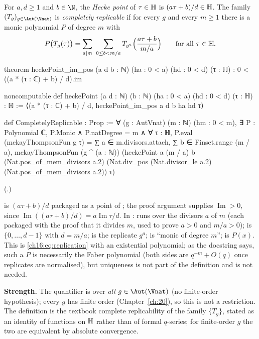 \begin{definition}\label{ch16:def:replicable}
For $a,d\ge1$ and $b\in\N$, the \emph{Hecke point} of $\tau\in\mathbb{H}$ is $(a\tau+b)/d\in\mathbb{H}$.  The family
$(T_g)_{g\in\Aut(\Vnat)}$ is \emph{completely replicable} if for every $g$ and every $m\ge1$ there is a monic
polynomial $P$ of degree $m$ with
\begin{equation*}
  P\bigl(T_g(\tau)\bigr)=\sum_{a\mid m}\ \sum_{0\le b<m/a}T_{g^a}\Bigl(\frac{a\tau+b}{m/a}\Bigr)
  \qquad\text{for all }\tau\in\chsixteenH .
\end{equation*}
\end{definition}
\begin{leancode}
theorem heckePoint_im_pos (a d b : ℕ) (ha : 0 < a) (hd : 0 < d) (τ : ℍ) :
    0 < ((a * (τ : ℂ) + b) / d).im

noncomputable def heckePoint (a d : ℕ) (b : ℕ) (ha : 0 < a) (hd : 0 < d) (τ : ℍ) : ℍ :=
  ⟨(a * (τ : ℂ) + b) / d, heckePoint_im_pos a d b ha hd τ⟩

def CompletelyReplicable : Prop :=
  ∀ (g : AutVnat) (m : ℕ) (hm : 0 < m), ∃ P : Polynomial ℂ, P.Monic ∧ P.natDegree = m ∧
    ∀ τ : ℍ, P.eval (mckayThompsonFun g τ) =
      ∑ a ∈ m.divisors.attach, ∑ b ∈ Finset.range (m / a),
        mckayThompsonFun (g ^ (a : ℕ)) (heckePoint a (m / a) b (Nat.pos_of_mem_divisors a.2)
          (Nat.div_pos (Nat.divisor_le a.2) (Nat.pos_of_mem_divisors a.2)) τ)
\end{leancode}
(.)
\begin{dictionary}
 is $(a\tau+b)/d$ packaged as a point of ; the proof argument
 supplies $\operatorname{Im}>0$, since $\operatorname{Im}((a\tau+b)/d)=a\operatorname{Im}\tau/d$.
In :  runs over the divisors $a$ of $m$ (each packaged with the proof
that it divides $m$, used to prove $a>0$ and $m/a>0$);  is $\{0,\dots,d-1\}$ with
$d=m/a$;  is the replicate $g^a$;  is ``monic of degree $m$'';
 is $P(x)$.  This is \eqref{ch16:eq:replication} with an existential polynomial; as the docstring says,
such a $P$ is necessarily the Faber polynomial (both sides are $q^{-m}+O(q)$ once replicates are normalised), but
uniqueness is not part of the definition and is not needed.

\textbf{Strength.}  The quantifier is over \emph{all} $g\in\Aut(\Vnat)$ (no finite-order hypothesis); every $g$ has
finite order (Chapter~\ref{ch:20}), so this is not a restriction.  The definition is the textbook complete
replicability of the family $\{T_g\}$, stated as an identity of functions on $\mathbb{H}$ rather than of formal
$q$-series; for finite-order $g$ the two are equivalent by absolute convergence.
\end{dictionary}
